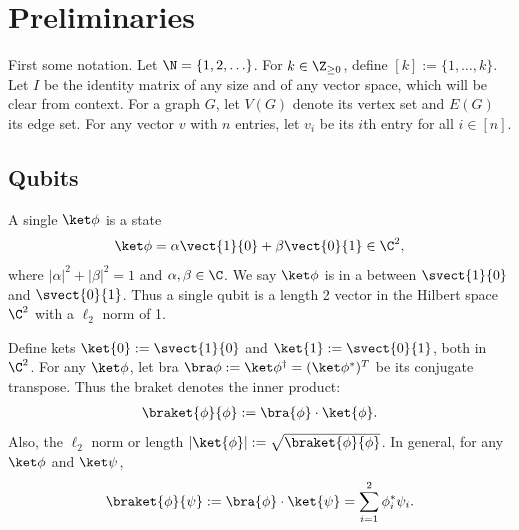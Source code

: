 \section{Preliminaries}

First some notation. Let $\N = \{1,2,\ldots\}$. For $k \in \Z_{\geq0}$, define $[k] := \{1,\ldots,k\}$. Let $I$ be the identity matrix of any size and of any vector space, which will be clear from context. For a graph $G$, let $V(G)$ denote its vertex set and $E(G)$ its edge set. For any vector $v$ with $n$ entries, let $v_i$ be its $i$th entry for all $i \in [n]$. 

\subsection{Qubits}

\begin{definition}
A single  $\ket\phi$ is a state
\begin{align}
    \ket\phi = \alpha\vect{1}{0} + \beta\vect{0}{1} \in \C^2,
\end{align}
where $|\alpha|^2 + |\beta|^2 = 1$ and $\alpha, \beta \in \C$. We say $\ket\phi$ is in a  between $\svect{1}{0}$ and $\svect{0}{1}$. Thus a single qubit is a length 2 vector in the Hilbert space $\C^2$ with a $\ell_2$ norm of 1.
\end{definition}

\begin{definition}
Define kets $\ket{0} := \svect{1}{0}$ and $\ket{1} := \svect{0}{1}$, both in $\C^2$. For any $\ket\phi$, let bra $\bra\phi := \ket\phi^\dagger = (\ket\phi^*)^T$ be its conjugate transpose. Thus the braket denotes the inner product:
\begin{align}
    \braket{\phi}{\phi}
    := \bra{\phi} \cdot \ket{\phi}.
\end{align}
Also, the $\ell_2$ norm or length $|\ket{\phi}| := \sqrt{\braket{\phi}{\phi}}$. In general, for any $\ket\phi$ and $\ket\psi$,
\begin{align}
    \braket{\phi}{\psi}
    := \bra{\phi} \cdot \ket{\psi}
    = \sum_{i=1}^{2} \phi_i^* \psi_i.
\end{align}
\end{definition}

